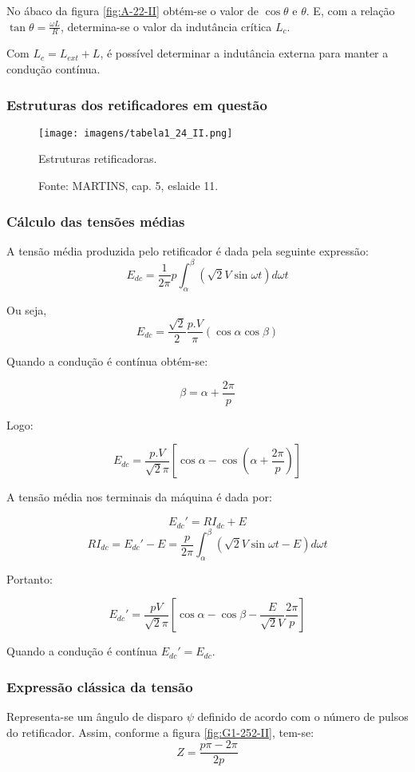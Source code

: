 No ábaco da figura \ref{fig:A-22-II} obtém-se o valor de $\cos{\theta}$ e $\theta$. E, com a relação $\tan{\theta} = \frac{\omega{L}}{R}$, determina-se o valor da indutância crítica $L_{c}$.

Com $L_{c} = L_{ext} + L$, é possível determinar a indutância externa para manter a condução contínua.

\subsubsection{Estruturas dos retificadores em questão}

\begin{figure}[ht!]
\center
\texttt{[image: imagens/tabela1\_24\_II.png]}
\caption{\label{fig:T-24-II} Estruturas retificadoras.}
\caption*{Fonte: MARTINS, cap. 5, eslaide 11.}
\end{figure}

\subsubsection{Cálculo das tensões médias}

A tensão média produzida pelo retificador é dada pela seguinte expressão:
\[E_{dc} = \frac{1}{2\pi}{p} \int_{\alpha}^{\beta}\left(\sqrt{2}V\sin{\omega{t}}\right)d\omega{t}\]

Ou seja,
\[E_{dc} = \frac{\sqrt{2}}{2}\frac{p.V}{\pi}\left(\cos{\alpha} \cos{\beta}\right)\]

Quando a condução é contínua obtém-se:

\[\beta = \alpha + \frac{2\pi}{p}\]

Logo:

\[E_{dc} = \frac{p.V}{\sqrt{2}\pi}\left[\cos{\alpha} - \cos{\left(\alpha + \frac{2\pi}{p}\right)}\right]\]

A tensão média nos terminais da máquina é dada por:

\[E_{dc}' = RI_{dc} + E \]
\[RI_{dc} = E_{dc}' - E = \frac{p}{2\pi}\int_{\alpha}^{\beta}\left(\sqrt{2}V\sin{\omega{t} - E}\right)d\omega{t} \]

Portanto:

\[E_{dc}' = \frac{pV}{\sqrt{2}\pi}\left[\cos{\alpha} - \cos{\beta} - \frac{E}{\sqrt{2}V}\frac{2\pi}{p}\right]\]

Quando a condução é contínua $E_{dc}' = E_{dc}$.

\subsubsection{Expressão clássica da tensão}
Representa-se um ângulo de disparo $\psi$ definido de acordo com o número de pulsos do retificador. Assim, conforme a figura \ref{fig:G1-252-II}, tem-se:
\[Z = \frac{p\pi - 2\pi}{2p}\]

